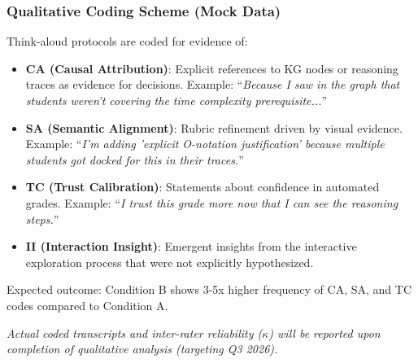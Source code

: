 \documentclass[journal,review]{vgtc}
\begin{document}
\subsubsection{Qualitative Coding Scheme (Mock Data)}

Think-aloud protocols are coded for evidence of:

\begin{itemize}
  \item \textbf{CA (Causal Attribution)}: Explicit references to KG nodes or reasoning traces as evidence for decisions. Example: ``\textit{Because I saw in the graph that students weren't covering the time complexity prerequisite...}''

  \item \textbf{SA (Semantic Alignment)}: Rubric refinement driven by visual evidence. Example: ``\textit{I'm adding 'explicit O-notation justification' because multiple students got docked for this in their traces.}''

  \item \textbf{TC (Trust Calibration)}: Statements about confidence in automated grades. Example: ``\textit{I trust this grade more now that I can see the reasoning steps.}''

  \item \textbf{II (Interaction Insight)}: Emergent insights from the interactive exploration process that were not explicitly hypothesized.
\end{itemize}

Expected outcome: Condition B shows 3-5x higher frequency of CA, SA, and TC codes compared to Condition A.

\textit{Actual coded transcripts and inter-rater reliability ($\kappa$) will be reported upon completion of qualitative analysis (targeting Q3 2026).}




\end{document}
